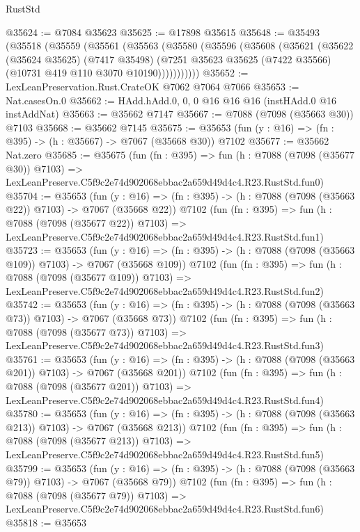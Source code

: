 \begin{lexlean}{RustStd}
\begin{coremodule}
@35624 := @7084 @35623
@35625 := @17898 @35615
@35648 := @35493
    (@35518
      (@35559
        (@35561
          (@35563
            (@35580
              (@35596
                (@35608
                  (@35621
                    (@35622
                      (@35624 @35625)
                      (@7417 @35498)
                      (@7251 @35623 @35625 (@7422 @35566) (@10731 @419 @110 @3070 @10190)))))))))))
@35652 := LexLeanPreservation.Rust.CrateOK @7062 @7064 @7066
@35653 := Nat.casesOn.{0}
@35662 := HAdd.hAdd.{0, 0, 0} @16 @16 @16 (instHAdd.{0} @16 instAddNat)
@35663 := @35662 @7147
@35667 := @7088 (@7098 (@35663 @30)) @7103
@35668 := @35662 @7145
@35675 := @35653 (fun (y : @16) => (fn : @395) -> (h : @35667) -> @7067 (@35668 @30)) @7102
@35677 := @35662 Nat.zero
@35685 := @35675
    (fun (fn : @395) =>
    fun (h : @7088 (@7098 (@35677 @30)) @7103) =>
    LexLeanPreserve.C5f9c2e74d902068ebbac2a659d49d4c4.R23.RustStd.fun0)
@35704 := @35653
    (fun (y : @16) => (fn : @395) -> (h : @7088 (@7098 (@35663 @22)) @7103) -> @7067 (@35668 @22))
    @7102
    (fun (fn : @395) =>
    fun (h : @7088 (@7098 (@35677 @22)) @7103) =>
    LexLeanPreserve.C5f9c2e74d902068ebbac2a659d49d4c4.R23.RustStd.fun1)
@35723 := @35653
    (fun (y : @16) => (fn : @395) -> (h : @7088 (@7098 (@35663 @109)) @7103) -> @7067 (@35668 @109))
    @7102
    (fun (fn : @395) =>
    fun (h : @7088 (@7098 (@35677 @109)) @7103) =>
    LexLeanPreserve.C5f9c2e74d902068ebbac2a659d49d4c4.R23.RustStd.fun2)
@35742 := @35653
    (fun (y : @16) => (fn : @395) -> (h : @7088 (@7098 (@35663 @73)) @7103) -> @7067 (@35668 @73))
    @7102
    (fun (fn : @395) =>
    fun (h : @7088 (@7098 (@35677 @73)) @7103) =>
    LexLeanPreserve.C5f9c2e74d902068ebbac2a659d49d4c4.R23.RustStd.fun3)
@35761 := @35653
    (fun (y : @16) => (fn : @395) -> (h : @7088 (@7098 (@35663 @201)) @7103) -> @7067 (@35668 @201))
    @7102
    (fun (fn : @395) =>
    fun (h : @7088 (@7098 (@35677 @201)) @7103) =>
    LexLeanPreserve.C5f9c2e74d902068ebbac2a659d49d4c4.R23.RustStd.fun4)
@35780 := @35653
    (fun (y : @16) => (fn : @395) -> (h : @7088 (@7098 (@35663 @213)) @7103) -> @7067 (@35668 @213))
    @7102
    (fun (fn : @395) =>
    fun (h : @7088 (@7098 (@35677 @213)) @7103) =>
    LexLeanPreserve.C5f9c2e74d902068ebbac2a659d49d4c4.R23.RustStd.fun5)
@35799 := @35653
    (fun (y : @16) => (fn : @395) -> (h : @7088 (@7098 (@35663 @79)) @7103) -> @7067 (@35668 @79))
    @7102
    (fun (fn : @395) =>
    fun (h : @7088 (@7098 (@35677 @79)) @7103) =>
    LexLeanPreserve.C5f9c2e74d902068ebbac2a659d49d4c4.R23.RustStd.fun6)
@35818 := @35653

\end{coremodule}
\end{lexlean}

